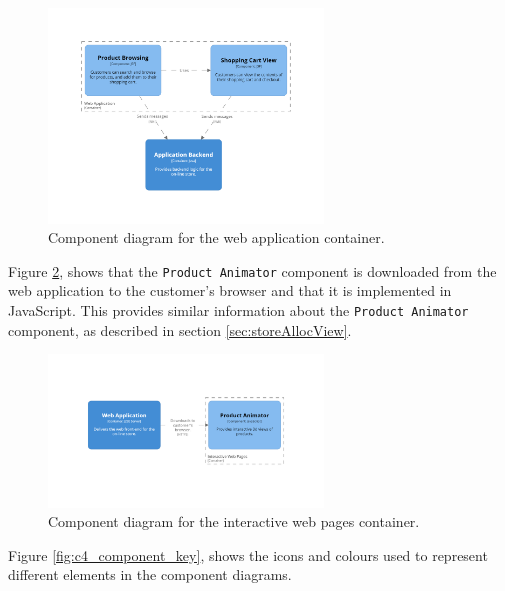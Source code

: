 \begin{figure}[h!]
    \centering
    \includegraphics[trim=190 193 190 195,clip,width=0.65\textwidth]{images/c4/webapp_component_diagram.png}
    \caption{Component diagram for the web application container.}
    \label{fig:c4_component_webapp}
\end{figure}

\noindent
Figure \ref{fig:c4_component_browser}, shows that the \texttt{Product Animator} component
is downloaded from the web application to the customer's browser and that it is implemented in JavaScript.
This provides similar information about the \texttt{Product Animator} component, as described in section \ref{sec:storeAllocView}.

\begin{figure}[h!]
    \centering
    \includegraphics[trim=245 265 245 270,clip,width=0.65\textwidth]{images/c4/browser_component_diagram.png}
    \caption{Component diagram for the interactive web pages container.}
    \label{fig:c4_component_browser}
\end{figure}

\pagebreak
\noindent
Figure \ref{fig:c4_component_key}, shows the icons and colours used to represent different elements in the component diagrams.

